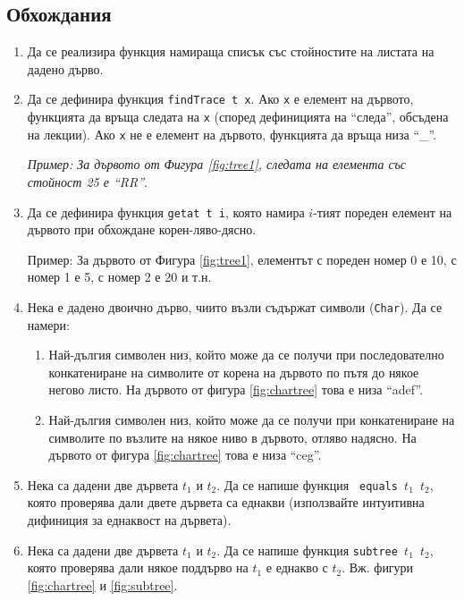 \subsection {Обхождания}
\begin{enumerate}[resume]

  \item Да се реализира функция   намираща списък със стойностите на листата на дадено дърво.

  \item Да се дефинира функция \texttt{findTrace t x}. Ако \texttt{x} е елемент на дървото, функцията да връща следата на \texttt{x} (според дефиницията на ``следа'', обсъдена на лекции). Ако \texttt{x} не е елемент на дървото, функцията да връща низа ``\_''.

  \textit{Пример: За дървото от Фигура \ref{fig:tree1}, следата на елемента със стойност 25 е ``RR''}.
    
  \item Да се дефинира функция \texttt{getat t i}, която намира $i$-тият пореден елемент на дървото при обхождане корен-ляво-дясно.
  
  Пример: За дървото от Фигура \ref{fig:tree1}, елементът с пореден номер 0 е 10, с номер 1 е 5, с номер 2 е 20 и т.н.

  \item Нека е дадено двоично дърво, чиито възли съдържат символи (\texttt{Char}). Да се намери:
  
  \begin{enumerate}[label=\alph*)]
    \item Най-дългия символен низ, който може да се получи при последователно конкатениране на символите от корена на дървото по пътя до някое негово листо. На дървото от фигура \ref{fig:chartree} това е низа ``adef''.
    \item Най-дългия символен низ, който може да се получи при конкатениране на символите по възлите на някое ниво в дървото, отляво надясно. На дървото от фигура \ref{fig:chartree} това е низа ``ceg''.
  \end{enumerate}

  \item Нека са дадени две дървета $t_1$ и $t_2$. Да се напише функция \texttt{ equals $t_1$ $t_2$}, която проверява дали двете дървета са еднакви (използвайте интуитивна дифиниция за еднаквост на дървета).

  \item Нека са дадени две дървета $t_1$ и $t_2$. Да се напише функция \texttt{subtree $t_1$ $t_2$}, която проверява дали някое поддърво на $t_1$ е еднакво с $t_2$. Вж. фигури \ref{fig:chartree} и \ref{fig:subtree}.

\end{enumerate}


